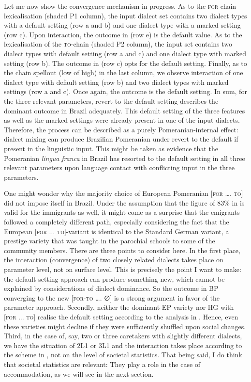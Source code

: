 \documentclass[output=paper,hidelinks,draftmode]{langscibook}
\begin{document}
\largerpage
Let me now show the convergence mechanism in progress. As to the \textsc{for}-chain lexicalisation (shaded P1 column), the input dialect set contains two dialect types with a default setting (row a and b) and one dialect type with a marked setting (row c). Upon interaction, the outcome in (row e) is the default value. As to the lexicalisation of the \textsc{to}-chain (shaded P2 column), the input set contains two dialect types with default setting (row a and c) and one dialect type with marked setting (row b). The outcome in (row c) opts for the default setting. Finally, as to the chain spellout (low of high) in the last column, we observe interaction of one dialect type with default setting (row b) and two dialect types with marked settings (row a and c). Once again, the outcome is the default setting. In sum, for the three relevant parameters, revert to the default setting describes the dominant outcome in Brazil adequately. This default setting of the three features as well as the marked settings were already present in one of the input dialects. Therefore, the process can be described as a purely Pomeranian-internal effect: dialect mixing can produce Brazilian Pomeranian under revert to the default if present in the linguistic input. This might be taken as evidence that the Pomeranian \textit{lingua} \textit{franca} in Brazil has resorted to the default setting in all three relevant parameters upon language contact with conflicting input in the three parameters.

\largerpage
One might wonder why the majority choice of European Pomeranian [\textsc{for} …. \textsc{to}] did not impose itself in Brazil. Under the assumption that the figure of 83\% in  is valid for the immigrants as well, it might come as a surprise that the emigrants followed a completely different path, especially considering the fact that the European [\textsc{for} ... \textsc{to}]-variant is identical to the Standard German variant, a prestige variety that was taught in the parochial schools to some of the community members. There are three points to consider here. In the first place, the interaction (convergence) of two closely related dialects takes place on parameter level, not on surface level. This is precisely the point I want to make: the default setting approach can produce something new, which cannot be explained by considerations of dialect dominance. So the outcome in BP converging to the new [\textsc{for-to} …. ∅] is a strong argument in favor of the parameter approach. Secondly, neither the dominant EP variety nor HG with [\textsc{for ... to}] realise the default setting according to the analysis in . Hence, even these varieties might decline if they were sufficiently shuffled upon social changes. Third, in the case of, say, two or three caretakers with slightly different dialects, we have the situation of 2L1 or 3L1 and the interaction takes place according to the scheme in , not on the level of societal statistics. That being said, I do think that societal statistics are relevant: They play a role in the case of accommodation, as we will see in the next section.
\end{document}
